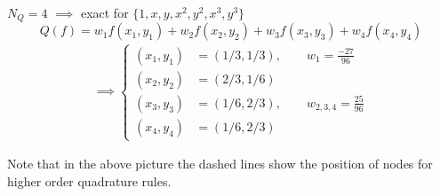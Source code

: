 $N_Q = 4$ $\implies$ exact for $\{1,x,y,x^2,y^2,x^3,y^3\}$
\begin{equation*}
Q(f)= w_1f(x_1,y_1) + w_2f(x_2,y_2) + w_3f(x_3,y_3) + w_4f(x_4,y_4)
\end{equation*}
\begin{align*}\implies
\begin{cases}
(x_1,y_1)&= (1/3,1/3),  \qquad w_1= \frac{-27}{96}\\
(x_2,y_2)&= (2/3,1/6)  \\
(x_3,y_3)&= (1/6,2/3),  \qquad w_{2,3,4}= \frac{25}{96}\\
(x_4,y_4)&= (1/6,2/3)
\end{cases} 
\end{align*}

Note that in the above picture the dashed lines show the position of nodes for higher order quadrature rules.
